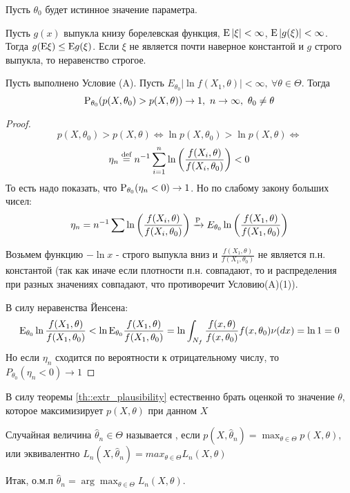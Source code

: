 Пусть \(\theta_0\) будет истинное значение параметра.
\begin{lemma}
    Пусть \(g(x)\) выпукла книзу борелевская функция, \(\E\left\lvert \xi \right\rvert  <\infty\),
    \(\E\left\lvert g(\xi) \right\rvert  <\infty\). Тогда \(g(\E\xi) \leq \E g(\xi)\). Если \(\xi\)
    не является почти наверное константой и \(g\) строго выпукла, то неравенство строгое.
\end{lemma}
\begin{theorem}
    \label{th::extr_plausibility}
    Пусть выполнено Условие (A). Пусть \(E_{\theta_0} \left\lvert \ln f(X_1, \theta) \right\rvert  < \infty,\ \forall \theta \in \Theta\).
    Тогда
    \[\P_{\theta_0}(p(X, \theta_0) > p(X, \theta)) \rightarrow 1,\ n\rightarrow \infty,\ \theta_0 \neq \theta\]
\end{theorem}
\begin{proof}
    \[p(X, \theta_0) > p(X, \theta) \Leftrightarrow \ln p(X, \theta_0) > \ln p(X, \theta) \Leftrightarrow\]
    \[\eta_n\defeq n^{-1} \sum_{i=1}^n \ln \left(\frac{f(X_i, \theta)}{f(X_i, \theta_0)}\right) < 0\]
    То есть надо показать, что \(\P_{\theta_0}(\eta_n < 0) \rightarrow 1\). Но по слабому закону больших чисел:
    \[\eta_n = n^{-1}\sum \ln \left(\frac{f(X_i, \theta)}{f(X_i, \theta_0)} \right) \xrightarrow{\P}
    E_{\theta_0}\ln \left(\frac{f(X_1, \theta)}{f(X_1, \theta_0)} \right) \]

    Возьмем функцию \(-\ln x\) - строго выпукла вниз и \(\frac{f(X_1, \theta)}{f(X_1, \theta_0)}\)
    не является п.н. константой (так как иначе если плотности п.н. совпадают,
    то и распределения при разных значениях совпадают, что противоречит Условию(A)(1)).

    В силу неравенства Йенсена:
    \[\E_{\theta_0} \ln \frac{f(X_1, \theta)}{f(X_1, \theta_0)} < \ln \E_{\theta_0} \frac{f(X_1, \theta)}{f(X_1, \theta_0)} = \ln \int_{N_f} \frac{f(x, \theta)}{f(x, \theta_0)} f(x, \theta_0) \nu(dx) = \ln1 = 0\]
    Но если \(\eta_n\) сходится по вероятности к отрицательному числу, то \(P_{\theta_0}(\eta_n < 0) \rightarrow 1\)
\end{proof}
В силу теоремы \ref{th::extr_plausibility} естественно брать
оценкой то значение \(\theta\), которое максимизирует \(p(X, \theta)\) при данном \(X\)

\begin{definition}
    Случайная величина \(\widehat{\theta}_n \in \Theta\) называется
    , если
    \(p(X, \widehat{\theta}_n) = \max_{\theta\in\Theta} p(X, \theta)\),
    или эквивалентно \(L_n(X, \widehat{\theta}_n) = max_{\theta\in\Theta} L_n(X, \theta)\)
\end{definition}
Итак, о.м.п \(\widehat{\theta}_n = \arg\max_{\theta\in\Theta} L_n(X, \theta)\).

